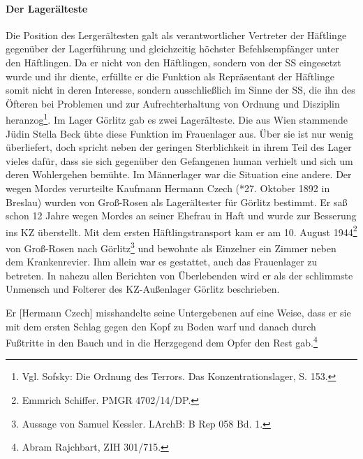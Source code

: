 \paragraph{Der Lagerälteste}\label{czech} Die Position des Lergerältesten galt als verantwortlicher Vertreter der Häftlinge gegenüber der Lagerführung und gleichzeitig höchster Befehlsempfänger unter den Häftlingen. Da er nicht von den Häftlingen, sondern von der SS eingesetzt wurde und ihr diente, erfüllte er die Funktion als Repräsentant der Häftlinge somit nicht in deren Interesse, sondern ausschließlich im Sinne der SS, die ihn des Öfteren bei Problemen und zur Aufrechterhaltung von Ordnung und Disziplin heranzog\footnote{Vgl. Sofsky: Die Ordnung des Terrors. Das Konzentrationslager, S. 153.}.
\newline
Im Lager Görlitz gab es zwei Lagerälteste. Die aus Wien stammende Jüdin Stella Beck übte diese Funktion im Frauenlager aus. Über sie ist nur wenig überliefert, doch spricht neben der geringen Sterblichkeit in ihrem Teil des Lager vieles dafür, dass sie sich gegenüber den Gefangenen human verhielt und sich um deren Wohlergehen bemühte.
\newline
Im Männerlager war die Situation eine andere.
Der wegen Mordes verurteilte Kaufmann Hermann Czech (*27. Oktober 1892 in Breslau) wurden von Groß-Rosen als Lagerältester für Görlitz bestimmt. Er saß schon 12 Jahre wegen Mordes an seiner Ehefrau in Haft und wurde zur Besserung ins KZ überstellt. Mit dem ersten Häftlingstransport kam er am 10. August 1944\footnote{Emmrich Schiffer. PMGR 4702/14/DP.} von Groß-Rosen nach Görlitz\footnote{Aussage von Samuel Kessler. LArchB: B Rep 058 Bd. 1.} und bewohnte als Einzelner ein Zimmer neben dem Krankenrevier. Ihm allein war es gestattet, auch das Frauenlager zu betreten. In nahezu allen Berichten von Überlebenden wird er als der schlimmste Unmensch und Folterer des KZ-Außenlager Görlitz beschrieben.

\begin{leftbar}
Er [Hermann Czech] misshandelte seine Untergebenen auf eine Weise, dass er sie mit dem ersten Schlag gegen den Kopf zu Boden warf und danach durch Fußtritte in den Bauch und in die Herzgegend dem Opfer den Rest gab.\footnote{Abram Rajchbart, ZIH 301/715.}
\end{leftbar}

